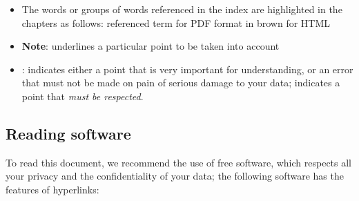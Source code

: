 \begin{itemize}
	\item The words or groups of words referenced in the index are highlighted in the chapters as follows:
		\newline
		\hspace*{1.5cm} \textopenbullet{} \textsf{referenced term} for \gls{PDF} format
		\newline
		\hspace*{1.5cm} \textopenbullet{} in brown for \gls{HTML}
	\item \textbf{Note}: underlines a particular point to be taken into account
	\item \textcolor{red}{}: indicates either a point that is very important for understanding, or an error that must not be made on pain of serious damage to your data;\newline
	\textcolor{red}{} indicates a point that \emph{must be respected}.

\end{itemize}





\subsection{Reading software \label{introduction-manual-readers}}

To read this document, we recommend the use of free software, which respects all your privacy and the confidentiality of your data; the following software has the features of \gls{hyperlinks}:

